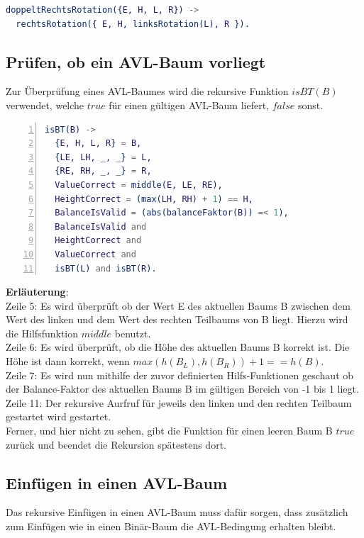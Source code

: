\documentclass{article}
\begin{document}
\begin{lstlisting}[language=erlang]
doppeltRechtsRotation({E, H, L, R}) ->
  rechtsRotation({ E, H, linksRotation(L), R }).
\end{lstlisting}
	
	\subsection{Prüfen, ob ein AVL-Baum vorliegt}
	
	Zur Überprüfung eines AVL-Baumes wird die rekursive Funktion $isBT(B)$ verwendet, welche $true$ für einen gültigen AVL-Baum liefert, $false$ sonst.
	
\begin{lstlisting}[language=erlang,numbers=left]
isBT(B) ->
  {E, H, L, R} = B,
  {LE, LH, _, _} = L,
  {RE, RH, _, _} = R,
  ValueCorrect = middle(E, LE, RE),
  HeightCorrect = (max(LH, RH) + 1) == H,
  BalanceIsValid = (abs(balanceFaktor(B)) =< 1),
  BalanceIsValid and
  HeightCorrect and 
  ValueCorrect and 
  isBT(L) and isBT(R).
\end{lstlisting}
	
	\textbf{Erläuterung}: \\
	Zeile 5: Es wird überprüft ob der Wert E des aktuellen Baums B zwischen dem Wert des linken und dem Wert des rechten Teilbaums von B liegt. Hierzu wird die Hilfsfunktion $middle$ benutzt.\\
	Zeile 6: Es wird überprüft, ob die Höhe des aktuellen Baums B korrekt ist. Die Höhe ist dann korrekt, wenn $max(h(B_L), h(B_R)) + 1 == h(B)$.\\
	Zeile 7: Es wird nun mithilfe der zuvor definierten Hilfs-Funktionen geschaut ob der Balance-Faktor des aktuellen Baums B im gültigen Bereich von -1 bis 1 liegt.\\
	Zeile 11: Der rekursive Aurfruf für jeweils den linken und den rechten Teilbaum gestartet wird gestartet.\\
	Ferner, und hier nicht zu sehen, gibt die Funktion für einen leeren Baum B $true$ zurück und beendet die Rekursion spätestens dort.
	
	\newpage
	
	\subsection{Einfügen in einen AVL-Baum}
	
	Das rekursive Einfügen in einen AVL-Baum muss dafür sorgen, dass zusätzlich zum Einfügen wie in einen Binär-Baum die AVL-Bedingung erhalten bleibt.
\end{document}
